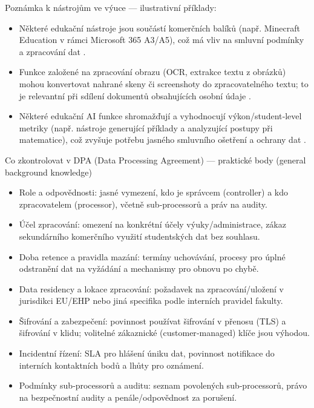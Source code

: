 \documentclass{report}%
\begin{document}
Poznámka k nástrojům ve výuce — ilustrativní příklady:
\begin{itemize}
  \item Některé edukační nástroje jsou součástí komerčních balíků (např. Minecraft Education v rámci Microsoft 365 A3/A5), což má vliv na smluvní podmínky a zpracování dat \cite{kb_ai_101_tipu_pdf_04e4a115_page_15_2}.
  \item Funkce založené na zpracování obrazu (OCR, extrakce textu z obrázků) mohou konvertovat nahrané skeny či screenshoty do zpracovatelného textu; to je relevantní při sdílení dokumentů obsahujících osobní údaje \cite{kb_ai_101_tipu_pdf_04e4a115_page_53_2}.
  \item Některé edukační AI funkce shromažďují a vyhodnocují výkon/student‑level metriky (např. nástroje generující příklady a analyzující postupy při matematice), což zvyšuje potřebu jasného smluvního ošetření a ochrany dat \cite{kb_ai_101_tipu_pdf_04e4a115_page_8_1}.
\end{itemize}

Co zkontrolovat v DPA (Data Processing Agreement) — praktické body (general background knowledge)
\begin{itemize}
  \item Role a odpovědnosti: jasné vymezení, kdo je správcem (controller) a kdo zpracovatelem (processor), včetně sub‑processorů a práv na audity.
  \item Účel zpracování: omezení na konkrétní účely výuky/administrace, zákaz sekundárního komerčního využití studentských dat bez souhlasu.
  \item Doba retence a pravidla mazání: termíny uchovávání, procesy pro úplné odstranění dat na vyžádání a mechanismy pro obnovu po chybě.
  \item Data residency a lokace zpracování: požadavek na zpracování/uložení v jurisdikci EU/EHP nebo jiná specifika podle interních pravidel fakulty.
  \item Šifrování a zabezpečení: povinnost používat šifrování v přenosu (TLS) a šifrování v klidu; volitelné zákaznické (customer‑managed) klíče jsou výhodou.
  \item Incidentní řízení: SLA pro hlášení úniku dat, povinnost notifikace do interních kontaktních bodů a lhůty pro oznámení.
  \item Podmínky sub‑processorů a auditu: seznam povolených sub‑processorů, právo na bezpečnostní audity a penále/odpovědnost za porušení.
\end{itemize}
\end{document}

